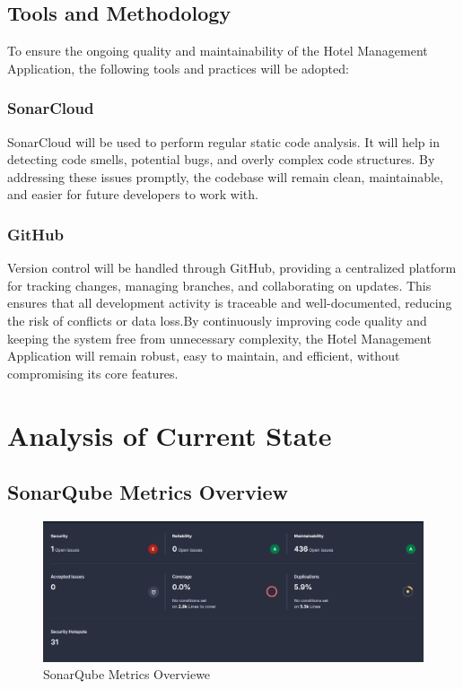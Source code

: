 \documentclass[12pt,a4paper]{article}
\begin{document}
\subsection{Tools and Methodology}
To ensure the ongoing quality and maintainability of the Hotel Management Application, 
the following tools and practices will be adopted:

\subsubsection{SonarCloud}
SonarCloud will be used to perform regular static code analysis. It will help in detecting code smells, potential bugs, 
and overly complex code structures. By addressing these issues promptly, the codebase will remain clean, maintainable, 
and easier for future developers to work with.
\subsubsection{GitHub}
Version control will be handled through GitHub, providing a centralized platform for tracking changes, managing branches, 
and collaborating on updates. This ensures that all development activity is traceable and well-documented, reducing the 
risk of conflicts or data loss.By continuously improving code quality and keeping the system free from unnecessary complexity, 
the Hotel Management Application will remain robust, easy to maintain, and efficient, without compromising its core features.

\section{Analysis of Current State}
\subsection{SonarQube Metrics Overview}
\begin{figure}[H]
    \centering
    \includegraphics[width=1\textwidth]{AbdouPhotos/Maintainability/SummaryBefore.png}
    \caption{SonarQube Metrics Overviewe}
    \label{fig:SMO}
\end{figure}
\end{document}
